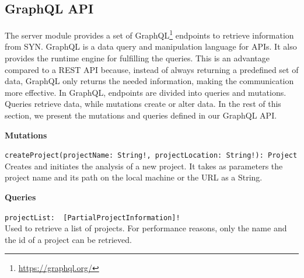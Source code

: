 \subsection*{GraphQL API} 
The server module provides a set of GraphQL\footnote{\url{https://graphql.org/}} endpoints to retrieve information from SYN. 
GraphQL is a data query and manipulation language for APIs. It also provides the runtime engine for fulfilling the queries.
This is an advantage compared to a REST API because, instead of always returning a predefined set of data, GraphQL only returns the needed information, making the communication more effective. 
In GraphQL, endpoints are divided into queries and mutations. Queries retrieve data, while mutations create or alter data. In the rest of this section, we present the mutations and queries defined in our GraphQL API.

\bigbreak
\noindent
\textbf{Mutations}

\noindent
\verb|createProject(projectName: String!, projectLocation: String!): Project| \\
\indent
Creates and initiates the analysis of a new project. It takes as parameters the project name and its path on the local machine or the URL as a String. 

\bigbreak
\noindent
\textbf{Queries}

\noindent
\verb|projectList:  [PartialProjectInformation]!| \\ 
\indent
Used to retrieve a list of projects. For performance reasons, only the name and the id of a project can be retrieved. 

